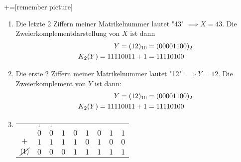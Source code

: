 \newcommand{\boxy}[2][yellow]{\mathchoice%
  {\pgfsetfillopacity{0.3}\colorbox{#1}{\pgfsetfillopacity{1}$\displaystyle#2$}}%
  {\pgfsetfillopacity{0.3}\colorbox{#1}{\pgfsetfillopacity{1}$\textstyle#2$}}%
  {\pgfsetfillopacity{0.3}\colorbox{#1}{\pgfsetfillopacity{1}$\scriptstyle#2$}}%
  {\pgfsetfillopacity{0.3}\colorbox{#1}{\pgfsetfillopacity{1}$\scriptscriptstyle#2$}}}%

+=[remember picture]

\begin{enumerate}[label={[OH\arabic*]},start=5]
    \item 
        \begin{enumerate}
            \item Die letzte 2 Ziffern meiner Matrikelnummer lautet "43" $\implies X = 43$. Die Zweierkomplementdarstellung von $X$ ist dann 
                \begin{align}
                    Y = (12)_{10} &= (0000 1100)_2 \notag \\
                    K_2(Y) = 11110011 + 1 &= 11110100
                \end{align}
            \item Die erste 2 Ziffern meiner Matrikelnummer lautet "12" $\implies Y = 12$. Die Zweierkomplement von $Y$ ist dann:
                \begin{align}
                    Y = (12)_{10} &= (0000 1100)_2 \notag \\
                    K_2(Y) = 11110011 + 1 &= 11110100
                \end{align}
            \item \blanko
                \vspace{-\baselineskip}
                \begin{center}
                    \begin{tabular}{c *{8}{@{\,}c}}
                              & {\scriptsize $_1$} & {\scriptsize $_1$} &&&&&&     \\
                              & $0$ & $0$ & $1$ & $0$ & $1$ & $0$ & $1$ & $1$ \\
                        $+$   & $1$ & $1$ & $1$ & $1$ & $0$ & $1$ & $0$ & $0$ \\
                        \hline
                        $\cancel{(1)}$ & $0$ & $0$ & $0$ & $1$ & $1$ & $1$ & $1$ & $1$
                    \end{tabular}

\end{center}
\end{enumerate}
\end{enumerate}
